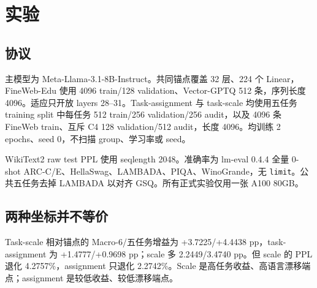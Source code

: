 \section{实验}

\subsection{协议}

主模型为 Meta-Llama-3.1-8B-Instruct。共同锚点覆盖 32 层、224 个 Linear，FineWeb-Edu 使用 4096 train/128 validation、Vector-GPTQ 512 条，序列长度 4096。适应只开放 layers 28--31。Task-assignment 与 task-scale 均使用五任务 training split 中每任务 512 train/256 validation/256 audit，以及 4096 条 FineWeb train、互斥 C4 128 validation/512 audit，长度 4096。均训练 2 epochs、seed 0，不扫描 group、学习率或 seed。

WikiText2 raw test PPL 使用 seqlength 2048。准确率为 lm-eval 0.4.4 全量 0-shot ARC-C/E、HellaSwag、LAMBADA、PIQA、WinoGrande，无 \texttt{limit}。公共五任务去掉 LAMBADA 以对齐 GSQ。所有正式实验仅用一张 A100 80GB。

\subsection{两种坐标并不等价}

\begin{table}[t]
\centering
\caption{同锚点、同监督与同码率的坐标比较。}
\label{tab:coordinates}
\end{table}

Task-scale 相对锚点的 Macro-6/五任务增益为 +3.7225/+4.4438 pp，task-assignment 为 +1.4777/+0.9698 pp；scale 多 2.2449/3.4740 pp。但 scale 的 PPL 退化 4.2757\%，assignment 只退化 2.2742\%。Scale 是高任务收益、高语言漂移端点；assignment 是较低收益、较低漂移端点。

